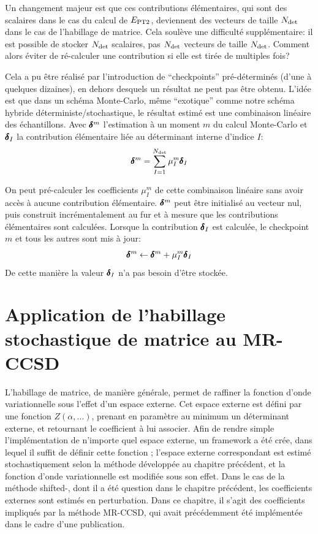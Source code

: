 \documentclass[./thesis.tex]{subfiles}
\begin{document}
Un changement majeur est que ces contributions élémentaires, qui sont des scalaires dans le cas du calcul de $E_\text{PT2}$, deviennent des vecteurs de taille ${N_\text{det}}$ dans le cas de l'habillage de matrice. Cela soulève une difficulté supplémentaire: il est possible de stocker ${N_\text{det}}$ scalaires, pas ${N_\text{det}}$ vecteurs de taille ${N_\text{det}}$. Comment alors éviter de ré-calculer une contribution si elle est tirée de multiples fois?

Cela a pu être réalisé par l’introduction de ``checkpoints'' pré-déterminés (d'une à quelques dizaines), en dehors desquels un résultat ne peut pas être obtenu. L'idée est que dans un schéma Monte-Carlo, même ``exotique'' comme notre schéma hybride déterministe/stochastique, le résultat estimé est une combinaison linéaire des échantillons. Avec $\pmb \delta^m$ l’estimation à un moment $m$ du calcul Monte-Carlo et $\pmb \delta_I$ la contribution élémentaire liée au déterminant interne d'indice $I$:
\begin{equation}
\pmb \delta^m = \sum_{I=1}^{{N_\text{det}}} \mu^m_{I} \pmb \delta_I
\end{equation}

On peut pré-calculer les coefficients $\mu_I^m$ de cette combinaison linéaire sans avoir accès à aucune contribution élémentaire. $\pmb \delta^m$ peut être initialisé au vecteur nul, puis construit incrémentalement au fur et à mesure que les contributions élémentaires sont calculées. Lorsque la contribution $\pmb \delta_I$ est calculée, le checkpoint $m$ et tous les autres sont mis à jour:
\begin{equation}
\pmb \delta^m \gets \pmb \delta^m + \mu^m_{I} \pmb \delta_I
\end{equation}
De cette manière la valeur $\pmb \delta_I$ n'a pas besoin d'être stockée.
 
\section{Application de l'habillage stochastique de matrice au MR-CCSD}

L'habillage de matrice, de manière générale, permet de raffiner la fonction d'onde variationnelle sous l'effet d'un espace externe. Cet espace externe est défini par une fonction $Z(\alpha,\ldots)$, prenant en paramètre au minimum un déterminant externe, et retournant le coefficient à lui associer. Afin de rendre simple l’implémentation de n'importe quel espace externe, un framework a été crée, dans lequel il suffit de définir cette fonction ; l'espace externe correspondant est estimé stochastiquement selon la méthode développée au chapitre précédent, et la fonction d'onde variationnelle est modifiée sous son effet.
Dans le cas de la méthode shifted-\Bk, dont il a été question dans le chapitre précédent, les coefficients externes sont estimés en perturbation. Dans ce chapitre, il s'agit des coefficients impliqués par la méthode MR-CCSD, qui avait précédemment été implémentée dans le cadre d'une publication.
 
\end{document}
